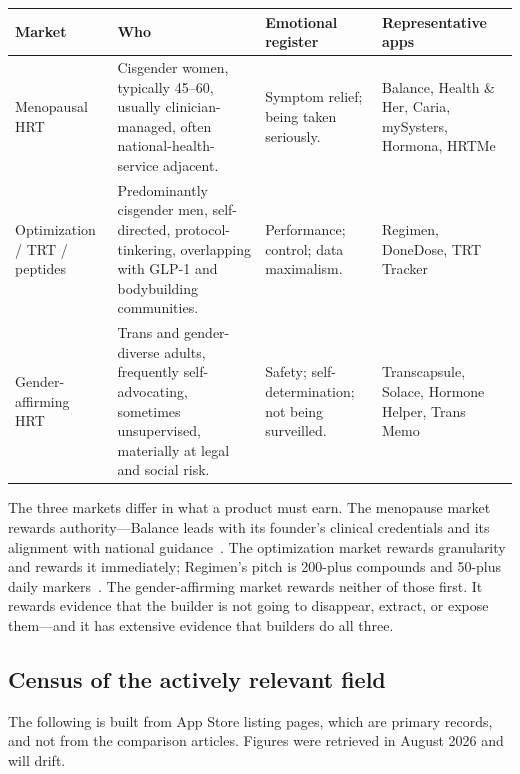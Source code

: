 \documentclass[11pt,a4paper]{article}
\begin{document}
\begin{longtable}{@{}L{3.2cm}L{5.0cm}L{3.1cm}L{3.6cm}@{}}
\toprule
\textbf{Market} & \textbf{Who} & \textbf{Emotional register} &
\textbf{Representative apps} \\
\midrule
\endhead
Menopausal HRT &
Cisgender women, typically 45--60, usually clinician-managed, often
national-health-service adjacent. &
Symptom relief; being taken seriously. &
Balance, Health \& Her, Caria, mySysters, Hormona, HRTMe \\[0.4em]

Optimization / TRT / peptides &
Predominantly cisgender men, self-directed, protocol-tinkering,
overlapping with GLP-1 and bodybuilding communities. &
Performance; control; data maximalism. &
Regimen, DoneDose, TRT Tracker \\[0.4em]

Gender-affirming HRT &
Trans and gender-diverse adults, frequently self-advocating, sometimes
unsupervised, materially at legal and social risk. &
Safety; self-determination; not being surveilled. &
Transcapsule, Solace, Hormone Helper, Trans Memo \\
\bottomrule
\end{longtable}

The three markets differ in what a product must earn. The menopause
market rewards authority---Balance leads with its founder's clinical
credentials and its alignment with national guidance~\cite{regimenblog}.
The optimization market rewards granularity and rewards it immediately;
Regimen's pitch is 200-plus compounds and 50-plus daily
markers~\cite{regimenlisting}. The gender-affirming market rewards
neither of those first. It rewards evidence that the builder is not
going to disappear, extract, or expose them---and it has extensive
evidence that builders do all three.

\subsection{Census of the actively relevant field}
\label{sec:census}

The following is built from App Store listing pages, which are primary
records, and not from the comparison articles. Figures were retrieved
in August 2026 and will drift.
\end{document}

